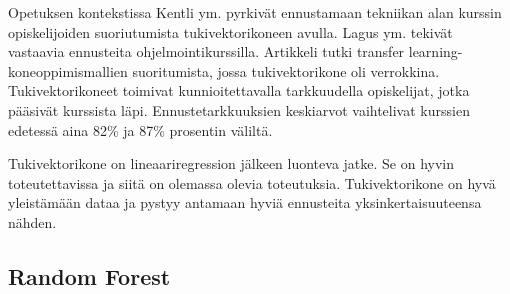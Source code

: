 \documentclass[finnish,twoside,openright]{HYgraduMLDS}
\begin{document}
Opetuksen kontekstissa Kentli ym. \cite{kentli2011svm} pyrkivät ennustamaan tekniikan alan kurssin opiskelijoiden suoriutumista tukivektorikoneen avulla. Lagus ym. \cite{lagus2018transfer} tekivät vastaavia ennusteita ohjelmointikurssilla. Artikkeli\cite{lagus2018transfer} tutki transfer learning-koneoppimismallien suoritumista, jossa tukivektorikone oli verrokkina. Tukivektorikoneet toimivat kunnioitettavalla tarkkuudella opiskelijat, jotka pääsivät kurssista läpi. Ennustetarkkuuksien keskiarvot vaihtelivat kurssien edetessä aina 82\% ja 87\% prosentin väliltä.

Tukivektorikone on lineaariregression jälkeen luonteva jatke. Se on hyvin toteutettavissa ja siitä on olemassa olevia toteutuksia. Tukivektorikone on hyvä yleistämään dataa ja pystyy antamaan hyviä ennusteita yksinkertaisuuteensa nähden.


\subsection{Random Forest}
\end{document}
